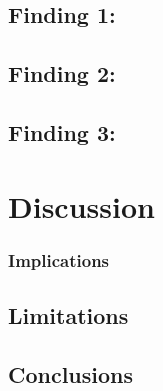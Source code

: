 \subsection{Finding 1:}
\subsection{Finding 2:}
\subsection{Finding 3:}

\section{Discussion}
\subsubsection{Implications}
\subsection{Limitations}
\subsection{Conclusions}

\clearpage
\printbibliography


